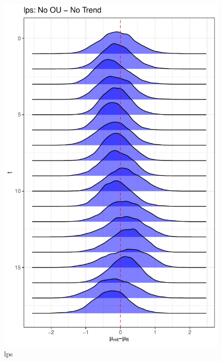 \documentclass[
  12pt,
]{article}
\begin{document}
\begin{figure}

{\centering \includegraphics[width=0.9\linewidth]{../Figures/lps/mu_diff} 

}

\caption{lps}\label{fig:unnamed-chunk-12}
\end{figure}
\end{document}
